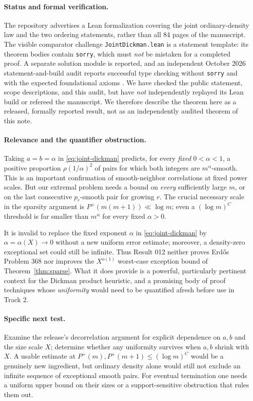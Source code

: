 \documentclass[11pt,letterpaper]{article}
\theoremstyle{remark}
\newcommand{\GPF}{P^{+}}
\begin{document}
\paragraph{Status and formal verification.}
The repository advertises a Lean formalization covering the joint
ordinary-density law and the two ordering statements, rather than all
84 pages of the manuscript. The visible comparator challenge
\texttt{JointDickman.lean} is a statement template: its theorem bodies
contain \texttt{sorry}, which must \emph{not} be mistaken for a completed
proof. A separate solution module is reported, and an independent
October 2026 statement-and-build audit reports successful type checking
without \texttt{sorry} and with the expected foundational axioms
\cite{OpenAILeanScope,Erdos928Review}. We have checked the public
statement, scope descriptions, and this audit, but have \emph{not}
independently replayed its Lean build or refereed the manuscript. We
therefore describe the theorem here as a released, formally reported
result, not as an independently audited theorem of this note.

\paragraph{Relevance and the quantifier obstruction.}
Taking $a=b=\alpha$ in \eqref{eq:joint-dickman} predicts, for
every \emph{fixed} $0<\alpha<1$, a positive proportion
$\rho(1/\alpha)^2$ of pairs for which both integers are
$m^\alpha$-smooth. This is an important confirmation of smooth-neighbor
correlations at fixed power scales. But our extremal problem needs a
bound on \emph{every} sufficiently large $m$, or on the last
consecutive $p_r$-smooth pair for growing $r$. The crucial necessary
scale in the sparsity argument is $\GPF(m(m+1))\ll\log m$;
even a $(\log m)^C$ threshold is far smaller than $m^\alpha$
for every fixed $\alpha>0$.

It is invalid to replace the fixed exponent $\alpha$ in
\eqref{eq:joint-dickman} by $\alpha=\alpha(X)\to0$ without a
new uniform error estimate; moreover, a density-zero exceptional
set could still be infinite. Thus Result 012 neither proves Erd\H{o}s
Problem 368 nor improves the $X^{o(1)}$ worst-case exception bound
of Theorem~\ref{thm:sparse}. What it does provide is a powerful,
particularly pertinent context for the Dickman product heuristic, and
a promising body of proof techniques whose \emph{uniformity} would
need to be quantified afresh before use in Track 2.

\paragraph{Specific next test.}
Examine the release's decorrelation argument for explicit dependence
on $a,b$ and the size scale $X$; determine whether any uniformity
survives when $a,b$ shrink with $X$. A usable estimate at
$\GPF(m),\GPF(m+1)\le(\log m)^C$ would be a genuinely
new ingredient, but ordinary density alone would still not exclude
an infinite sequence of exceptional smooth pairs. For eventual
termination one needs a uniform upper bound on their sizes or a
support-sensitive obstruction that rules them out.
\end{document}
